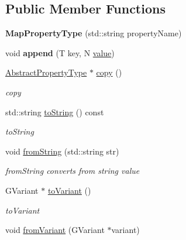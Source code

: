 \subsection*{Public Member Functions}
\begin{DoxyCompactItemize}
\item 
\hypertarget{classMapPropertyType_aa1a20f8411d6642e6d9d16d2c49e8616}{{\bfseries Map\+Property\+Type} (std\+::string property\+Name)}\label{classMapPropertyType_aa1a20f8411d6642e6d9d16d2c49e8616}

\item 
\hypertarget{classMapPropertyType_a204d5a2ef375b9f96badbac88e90c399}{void {\bfseries append} (T key, N \hyperlink{classAbstractPropertyType_ae723621925382263eba046fa1ca8e36d}{value})}\label{classMapPropertyType_a204d5a2ef375b9f96badbac88e90c399}

\item 
\hyperlink{classAbstractPropertyType}{Abstract\+Property\+Type} $\ast$ \hyperlink{classMapPropertyType_abcc0f1c2cd4faff2859420f90dd67cad}{copy} ()
\begin{DoxyCompactList}\small\item\em copy \end{DoxyCompactList}\item 
std\+::string \hyperlink{classMapPropertyType_a662d25c3cd9e1732f0cd2dabd38c1bcd}{to\+String} () const 
\begin{DoxyCompactList}\small\item\em to\+String \end{DoxyCompactList}\item 
\hypertarget{classMapPropertyType_aae407d89167cad46b2ab63971d1e68f5}{void \hyperlink{classMapPropertyType_aae407d89167cad46b2ab63971d1e68f5}{from\+String} (std\+::string str)}\label{classMapPropertyType_aae407d89167cad46b2ab63971d1e68f5}

\begin{DoxyCompactList}\small\item\em from\+String converts from string value \end{DoxyCompactList}\item 
G\+Variant $\ast$ \hyperlink{classMapPropertyType_a0dfca18093e88f7ae8788bf1ce852109}{to\+Variant} ()
\begin{DoxyCompactList}\small\item\em to\+Variant \end{DoxyCompactList}\item 
\hypertarget{classMapPropertyType_a9038e06690c5d3718be1aadb6752bfbe}{void \hyperlink{classMapPropertyType_a9038e06690c5d3718be1aadb6752bfbe}{from\+Variant} (G\+Variant $\ast$variant)}\label{classMapPropertyType_a9038e06690c5d3718be1aadb6752bfbe}


\end{DoxyCompactItemize}
